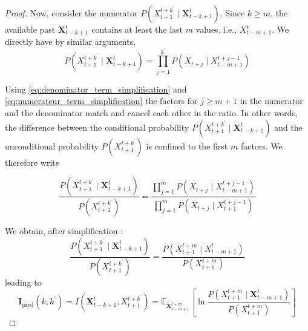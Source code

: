 \documentclass[10pt,a4paper]{amsart}
\begin{document}
\begin{proof}
Now, consider the numerator $P\left(X_{t+1}^{t+k^{\prime}} \mid \mathbf{X}_{t-k+1}^t\right)$. Since $k \geq m$, the available past $\mathbf{X}_{t-k+1}^t$ contains at least the last $m$ values, i.e., $X_{t-m+1}^t$. We directly have by similar arguments, 
\begin{equation}\label{eq:numerateur_term_simplification}
P\left(X_{t+1}^{t+k^{\prime}} \mid \mathbf{X}_{t-k+1}^t\right)=\prod_{j=1}^{k^{\prime}} P\left(X_{t+j} \mid X_{t-m+1}^{t+j-1}\right)
\end{equation}


Using \ref{eq:denominator_term_simplification} and \ref{eq:numerateur_term_simplification} the factors for $j \geq m+1$ in the numerator and the denominator match and cancel each other in the ratio. In other words, the difference between the conditional probability $P\left(X_{t+1}^{t+k^{\prime}} \mid \mathbf{X}_{t-k+1}^t\right)$ and the unconditional probability $P\left(X_{t+1}^{t+k^{\prime}}\right)$ is confined to the first $m$ factors. We therefore write

$$
\frac{P\left(X_{t+1}^{t+k^{\prime}} \mid \mathbf{X}_{t-k+1}^t\right)}{P\left(X_{t+1}^{t+k^{\prime}}\right)}=\frac{\prod_{j=1}^m P\left(X_{t+j} \mid X_{t-m+1}^{t+j-1}\right)}{\prod_{j=1}^m P\left(X_{t+j} \mid X_{t+1}^{t+j-1}\right)}
$$

We obtain, after simplification : 
$$
\frac{P\left(X_{t+1}^{t+k^{\prime}} \mid \mathbf{X}_{t-k+1}^t\right)}{P\left(X_{t+1}^{t+k^{\prime}}\right)}=\frac{P\left(X_{t+1}^{t+m} \mid X_{t-m+1}^t\right)}{P\left(X_{t+1}^{t+m}\right)}
$$
leading to 
$$\mathbf{I}_{\text{pred}}\left(k, k^{\prime}\right)=I\left(\mathbf{X}_{t-k+1}^t, X_{t+1}^{t+k^{\prime}}\right)=\mathbb{E}_{\mathbf{X}_{t-m+1}^{t+m}}\left[\ln \frac{P\left(X_{t+1}^{t+m} \mid \mathbf{X}_{t-m+1}^t\right)}{P\left(X_{t+1}^{t+m}\right)}\right]$$
\end{proof}
\end{document}
